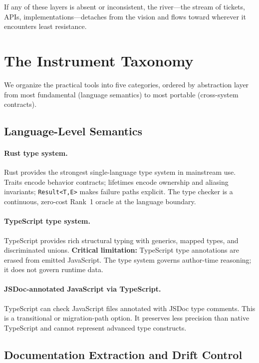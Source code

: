 \documentclass[11pt,a4paper]{article}
\theoremstyle{definition}
\begin{document}
If any of these layers is absent or inconsistent, the river---the stream of tickets, APIs, implementations---detaches from the vision and flows toward wherever it encounters least resistance.

\section{The Instrument Taxonomy}

We organize the practical tools into five categories, ordered by abstraction layer from most fundamental (language semantics) to most portable (cross-system contracts).

\subsection{Language-Level Semantics}

\paragraph{Rust type system.}
Rust provides the strongest single-language type system in mainstream use. Traits encode behavior contracts; lifetimes encode ownership and aliasing invariants; \texttt{Result<T,E>} makes failure paths explicit. The type checker is a continuous, zero-cost Rank~1 oracle at the language boundary.

\paragraph{TypeScript type system.}
TypeScript provides rich structural typing with generics, mapped types, and discriminated unions. \textbf{Critical limitation:} TypeScript type annotations are erased from emitted JavaScript. The type system governs author-time reasoning; it does not govern runtime data.

\paragraph{JSDoc-annotated JavaScript via TypeScript.}
TypeScript can check JavaScript files annotated with JSDoc type comments. This is a transitional or migration-path option. It preserves less precision than native TypeScript and cannot represent advanced type constructs.

\subsection{Documentation Extraction and Drift Control}
\end{document}
